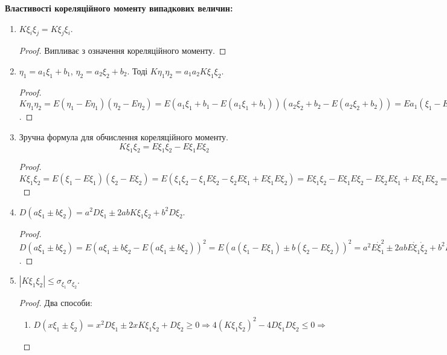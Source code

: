 \noindent \textbf{Властивості кореляційного моменту випадкових 
величин:}
\begin{enumerate}
    \item $K\xi_i\xi_j = K\xi_j\xi_i$.
    \begin{proof}
        Випливає з означення кореляційного моменту.
    \end{proof}
    \item $\eta_1 = a_1\xi_1 + b_1$, $\eta_2 = a_2\xi_2 + b_2$.
    Тоді $K\eta_1\eta_2 = a_1a_2K\xi_1\xi_2$.
    \begin{proof}
        $K\eta_1\eta_2 = E(\eta_1 - E\eta_1)(\eta_2 - E\eta_2) = 
        E(a_1\xi_1 + b_1 - E(a_1\xi_1 + b_1))
        (a_2\xi_2 + b_2 - E(a_2\xi_2 + b_2)) = 
        Ea_1(\xi_1 - E\xi_1)a_2(\xi_2 - E\xi_2) = 
        a_1a_2E(\xi_1 - E\xi_1)(\xi_2 - E\xi_2) = 
        a_1a_2K\xi_1\xi_2$.
    \end{proof}

    \item Зручна формула для обчислення кореляційного моменту.
    \begin{equation}
        K\xi_1\xi_2 = E\xi_1\xi_2 - E\xi_1 E\xi_2
    \end{equation}
    \begin{proof}
        $K\xi_1\xi_2 = E(\xi_1 - E\xi_1)(\xi_2 - E\xi_2) = 
        E(\xi_1\xi_2 - \xi_1E\xi_2 - \xi_2E\xi_1 + E\xi_1E\xi_2) = 
        E\xi_1\xi_2 - E\xi_1E\xi_2 - E\xi_2E\xi_1 + E\xi_1E\xi_2 = 
        E\xi_1\xi_2 - E\xi_1E\xi_2$
    \end{proof}
    
    \item $D(a\xi_1 \pm b\xi_2) = a^2D\xi_1 \pm 2abK\xi_1\xi_2 + 
    b^2D\xi_2$.

    \begin{proof}
        $D(a\xi_1 \pm b\xi_2) = 
        E(a\xi_1 \pm b\xi_2 - E(a\xi_1 \pm b\xi_2))^2 =
        E(a(\xi_1-E\xi_1)\pm b(\xi_2 - E\xi_2))^2 = 
        a^2 E\mathring{\xi}_1^2 \pm 2abE\mathring{\xi}_1\mathring{\xi} _2 
        + b^2 E\mathring{\xi}_2^2 = 
        a^2D\xi_1 \pm 2abK\xi_1\xi_2 + b^2D\xi_2$.
    \end{proof}

    \item $\left|K\xi_1\xi_2\right| \leq \sigma_{\xi_1} \sigma_{\xi_2}$.
    \begin{proof}
        Два способи: 
        \begin{enumerate}[label=\Roman*.]
            \item $D(x\xi_1 \pm \xi_2) = x^2 D\xi_1 \pm 2xK\xi_1\xi_2 + D\xi_2 \geq 0 
            \Rightarrow 4(K\xi_1\xi_2)^2 - 4D\xi_1D\xi_2 \leq 0 
            \Rightarrow $


\end{enumerate}
\end{proof}
\end{enumerate}

